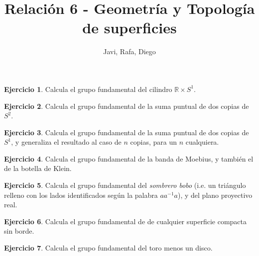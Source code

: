 \documentclass{article}
\theoremstyle{plain}
\theoremstyle{definition}
\newtheorem{exercise}{Ejercicio}
\begin{document}
\title{Relación 6 - Geometría y Topología de superficies }
\author{Javi, Rafa, Diego}
\maketitle

\begin{exercise}

Calcula el grupo fundamental del cilindro $\mathbb{R}\times S^1$.

\end{exercise}



\begin{exercise}

Calcula el grupo fundamental de la suma puntual de dos copias de $S^2$.

\end{exercise}

\begin{exercise}

Calcula el grupo fundamental de la suma puntual de dos copias de $S^1$, y generaliza el resultado al caso de $n$ copias, para un $n$ cualquiera.

\end{exercise}

\begin{exercise}

Calcula el grupo fundamental de la banda de Moebius, y tambi\'en el de la botella de Klein.

\end{exercise}


\begin{exercise}

Calcula el grupo fundamental del \emph{sombrero bobo} (i.e. un tri\'angulo relleno con los lados identificados seg\'un la palabra $aa^{-1}a$), y del plano proyectivo real.

\end{exercise}

\begin{exercise}

Calcula el grupo fundamental de de cualquier superficie compacta sin borde.

\end{exercise}

\begin{exercise}

Calcula el grupo fundamental del toro menos un disco.

\end{exercise}
\end{document}

